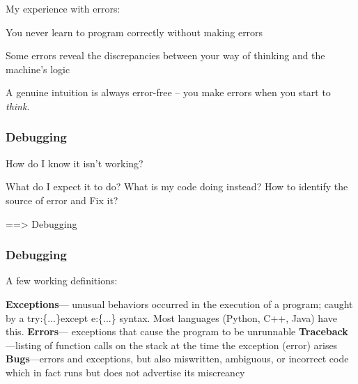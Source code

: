 \documentclass[11pt]{beamer}
\begin{document}
{ 
    \begin{frame}[plain]
    	My experience with errors:
	\begin{enumerate}
         \myitem  You never learn to program correctly without making errors
        
         \myitem  Some errors reveal the discrepancies between your way of thinking and the machine's logic
        
         \myitem  A genuine intuition is always error-free -- you make errors when you start to \emph{think}.
        \end{enumerate}
     
     \end{frame}
}

\begin{frame}[fragile]
  \frametitle{Debugging}
  \Enlarge
  
  How do I know it isn’t working?
  \begin{enumerate}
  \myitem  What do I expect it to do?
  \myitem  What is my code doing instead?
  \myitem  How to identify the source of error and Fix it? 
  \end{enumerate}
  \hspace{8mm}==> Debugging
\end{frame}



\begin{frame}[fragile]
  \frametitle{Debugging}
  \Enlarge

  \begin{enumerate}
  \myitem  A few working definitions:
  \begin{enumerate}
    \mysubitem  \textbf{Exceptions}--- unusual behaviors occurred in the execution of a program; caught by a try:\{...\}except e:\{...\} syntax. Most languages (Python, C++, Java) have this. \pause
    \mysubitem  \textbf{Errors}--- exceptions that cause the program to be unrunnable  \pause
    \mysubitem  \textbf{Traceback}---listing of function calls on the stack at the time the exception (error) arises \pause
    \mysubitem  \textbf{Bugs}---errors and exceptions, but also miswritten, ambiguous, or incorrect code which in fact runs but does not advertise its miscreancy
    \end{enumerate}
  \end{enumerate}
\end{frame}
\end{document}
